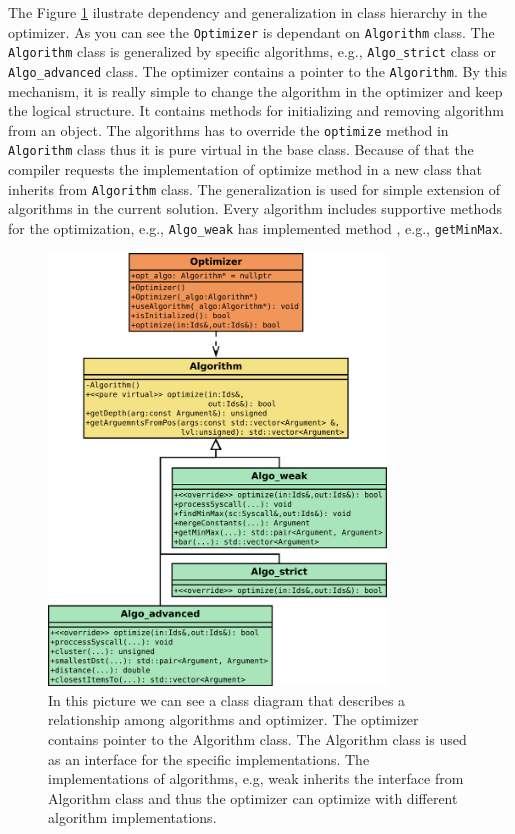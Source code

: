 The Figure \ref{fig:class:algo} ilustrate dependency and generalization in class
hierarchy in the optimizer. As you can see the \texttt{Optimizer} is dependant
on \texttt{Algorithm} class. The \texttt{Algorithm} class is generalized by
specific algorithms, e.g., \texttt{Algo\_strict} class or
\texttt{Algo\_advanced} class. The optimizer contains a pointer to the
\texttt{Algorithm}. By this mechanism, it is really simple to change the
algorithm in the optimizer and keep the logical structure. It contains methods
for initializing and removing algorithm from an object. The algorithms has to
override the \texttt{optimize} method in \texttt{Algorithm} class thus it is
pure virtual in the base class. Because of that the compiler requests the
implementation of optimize method in a new class that inherits from
\texttt{Algorithm} class. The generalization is used for simple extension of
algorithms in the current solution. Every algorithm includes supportive methods
for the optimization, e.g., \texttt{Algo\_weak} has implemented method , e.g.,
\texttt{getMinMax}.

\begin{figure}[H]
	\centering
	\includegraphics[width=0.8\textwidth]{obrazky-figures/class/algo.pdf}
	\caption{In this picture we can see a class diagram that describes
	a relationship among algorithms and optimizer. The optimizer contains pointer
	to the Algorithm class. The Algorithm class is used as an interface for
	the specific implementations. The implementations of algorithms, e.g, weak
	inherits the interface from Algorithm class and thus the optimizer can
	optimize with different algorithm implementations.}
	\label{fig:class:algo}
\end{figure}

